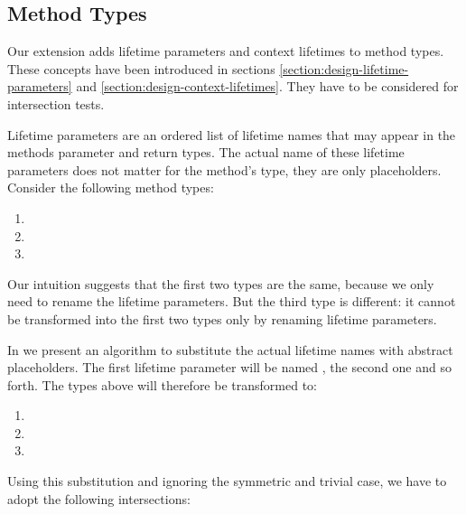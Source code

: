 \subsection{Method Types}\label{section:implementation-typecheck-methods}

Our extension adds lifetime parameters and context lifetimes to method types.
These concepts have been introduced in sections \ref{section:design-lifetime-parameters} and \ref{section:design-context-lifetimes}.
They have to be considered for intersection tests.

Lifetime parameters are an ordered list of lifetime names that may appear in the methods parameter and return types.
The actual name of these lifetime parameters does not matter for the method's type, they are only placeholders.
Consider the following method types:
\begin{enumerate}
\item {}
\item {}
\item {}
\end{enumerate}

\noindent Our intuition suggests that the first two types are the same, because we only need to rename the lifetime parameters.
But the third type is different:
it cannot be transformed into the first two types only by renaming lifetime parameters.

In  we present an algorithm to substitute the actual lifetime names with abstract placeholders.
The first lifetime parameter will be named , the second one  and so forth.
The types above will therefore be transformed to:
\begin{enumerate}
\item {}
\item {}
\item {}
\end{enumerate}

\noindent Using this substitution and ignoring the symmetric and trivial case, we have to adopt the following intersections:

